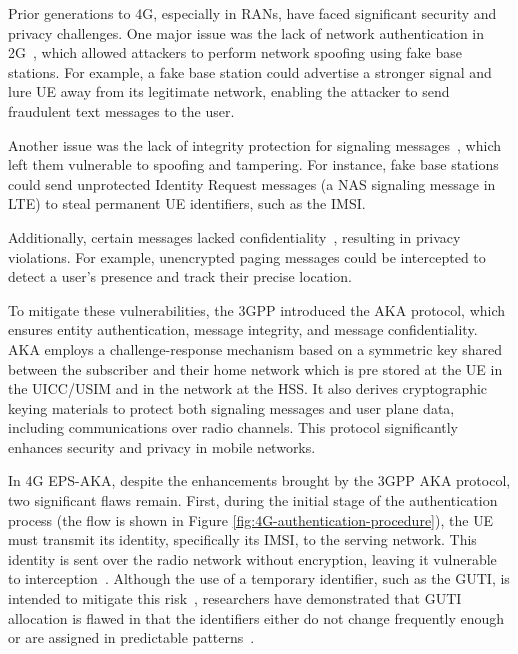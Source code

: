 Prior generations to \ac{4G}, especially in \acp{RAN}, have faced significant security and privacy challenges. One major issue was the lack of network authentication in \ac{2G}~\cite{cbl-comp-p1}, which allowed attackers to perform network spoofing using fake base stations. For example, a fake base station could advertise a stronger signal and lure \ac{UE} away from its legitimate network, enabling the attacker to send fraudulent text messages to the user.

Another issue was the lack of integrity protection for signaling messages~\cite{cbl-comp-p1}, which left them vulnerable to spoofing and tampering. For instance, fake base stations could send unprotected Identity Request messages (a \ac{NAS} signaling message in \ac{LTE}) to steal permanent \ac{UE} identifiers, such as the \ac{IMSI}.

Additionally, certain messages lacked confidentiality~\cite{cbl-comp-p1}, resulting in privacy violations. For example, unencrypted paging messages could be intercepted to detect a user’s presence and track their precise location. 

To mitigate these vulnerabilities, the \ac{3GPP} introduced the \ac{AKA} protocol, which ensures entity authentication, message integrity, and message confidentiality. \ac{AKA} employs a challenge-response mechanism based on a symmetric key shared between the subscriber and their home network which is pre stored at the \ac{UE} in the \ac{UICC}/\ac{USIM} and in the network at the \ac{HSS}. It also derives cryptographic keying materials to protect both signaling messages and user plane data, including communications over radio channels. This protocol significantly enhances security and privacy in mobile networks.

In \ac{4G} \ac{EPS-AKA}, despite the enhancements brought by the \ac{3GPP} \ac{AKA} protocol, two significant flaws remain. First, during the initial stage of the authentication process (the flow is shown in Figure \ref{fig:4G-authentication-procedure}), the \ac{UE} must transmit its identity, specifically its \ac{IMSI}, to the serving network. This identity is sent over the radio network without encryption, leaving it vulnerable to interception~\cite{cbl-comp-p3}. Although the use of a temporary identifier, such as the \ac{GUTI}, is intended to mitigate this risk~\cite{eleftherakis-2024}, researchers have demonstrated that \ac{GUTI} allocation is flawed in that the identifiers either do not change frequently enough~\cite{gt-freq} or are assigned in predictable patterns~\cite{gt-pred}.

